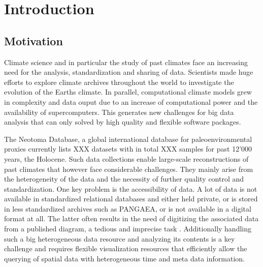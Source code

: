 
\chapter{Introduction} 

\label{chp:intro}

\begin{refsection}


\section{Motivation} \label{sec:motivation}

Climate science and in particular the study of past climates face an increasing need for the analysis, standardization and sharing of data. Scientists made huge efforts to explore climate archives throughout the world to investigate the evolution of the Earths climate\addref. In parallel, computational climate models grew in complexity and data ouput due to an increase of computational power and the availability of supercomputers\addref. This generates new challenges for big data analysis that can only solved by high quality and flexible software packages.

The Neotoma Database, a global international database for paleoenvironmental proxies \citep{WilliamsGrimmBloisEtAl2018} currently lists XXX datasets with in total XXX samples for past 12'000 years, the Holocene. Such data collections enable large-scale reconstructions of past climates that however face considerable challenges. They mainly arise from the heterogeneity of the data and the necessity of further quality control and standardization. One key problem is the accessibility of data. A lot of data is not available in standardized relational databases and either held private, or is stored in less standardized archives such as PANGAEA, or is not available in a digital format at all. The latter often results in the need of digitizing the associated data from a published diagram, a tedious and imprecise task \citep{SommerRechChevalierEtAl2019}. Additionally handling such a big heterogeneous data resource and analyzing its contents is a key challenge and requires flexible visualization resources that efficiently allow the querying of spatial data with heterogeneous time and meta data information.


\end{refsection}
